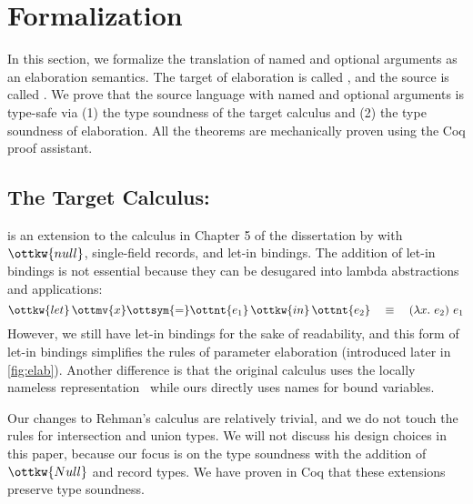 \section{Formalization} \label{sec:iu-uaena}

In this section, we formalize the translation of named and optional arguments as
an elaboration semantics. The target of elaboration is called \lambdaiu, and the
source is called \uaena. We prove that the source language with named and
optional arguments is type-safe via (1) the type soundness of the target
calculus and (2) the type soundness of elaboration. All the theorems are
mechanically proven using the Coq proof assistant.

\subsection{The Target Calculus: \lambdaiu} \label{sec:lambdaiu}

\lambdaiu is an extension to the calculus in Chapter 5 of the dissertation by
\citet{rehman2023blend} with $\ottkw{null}$, single-field records, and let-in
bindings. The addition of let-in bindings is not essential because they can be
desugared into lambda abstractions and applications:
\begin{equation*}
  \ottkw{let} \, \ottmv{x}  \ottsym{=}  \ottnt{e_{{\mathrm{1}}}} \, \ottkw{in} \, \ottnt{e_{{\mathrm{2}}}} \quad \equiv \quad (\lambda x.\ e_2)\ e_1
\end{equation*}
However, we still have let-in bindings for the sake of readability, and this
form of let-in bindings simplifies the rules of parameter elaboration
(introduced later in \autoref{fig:elab}). Another difference is that the
original calculus uses the locally nameless
representation~\citep{chargueraud2012locally} while ours directly uses names for
bound variables.

Our changes to Rehman's calculus are relatively trivial, and we do not touch the
rules for intersection and union types. We will not discuss his design choices
in this paper, because our focus is on the type soundness with the addition of
$\ottkw{Null}$ and record types. We have proven in Coq that these extensions
preserve type soundness.

